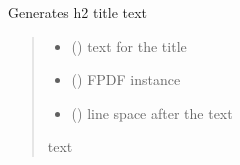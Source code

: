 \documentclass[letterpaper,10pt,english]{sphinxmanual}
\begin{document}
\begin{fulllineitems}
\label{\detokenize{auxilary_functions:auxilary_functions.h2}}
\pysigstartsignatures
{}
\pysigstopsignatures
\sphinxAtStartPar
Generates h2 title text
\begin{quote}\begin{description}
\begin{itemize}
\item {} 
\sphinxAtStartPar
{} () \textendash{} text for the title

\item {} 
\sphinxAtStartPar
{} () \textendash{} FPDF instance

\item {} 
\sphinxAtStartPar
{} () \textendash{} line space after the text

\end{itemize}

\sphinxAtStartPar
text

\end{description}\end{quote}

\end{fulllineitems}

\end{document}

